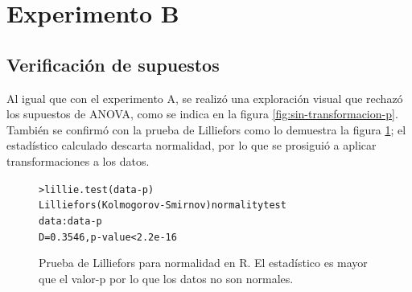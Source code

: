 
\section{Experimento B}

\subsection{Verificación de supuestos}

Al igual que con el experimento A, se realizó una exploración visual que rechazó los supuestos de ANOVA, como se indica en la figura \ref{fig:sin-transformacion-p}. También se confirmó con la prueba de Lilliefors como lo demuestra la figura \ref{fig:lillie-p}; el estadístico calculado descarta normalidad, por lo que se prosiguió a aplicar transformaciones a los datos.

\begin{figure}[H]
    \centering
        \small{
        \begin{alltt}
        
        
            > lillie.test(data-p)
                Lilliefors (Kolmogorov-Smirnov) normality test
            data:  data-p
            D = 0.3546, p-value < 2.2e-16
        \end{alltt}
        }
    \caption{Prueba de Lilliefors para normalidad en R. El estadístico es mayor que el valor-p por lo que los datos no son normales.}
    \label{fig:lillie-p}
\end{figure}

